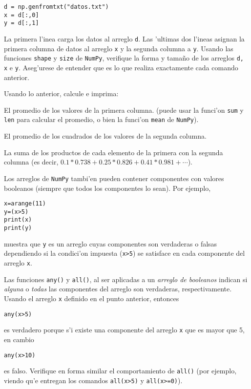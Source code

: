 \documentclass[11pt]{exam}
\begin{document}
\begin{questions}
\begin{verbatim}
d = np.genfromtxt("datos.txt")
x = d[:,0]
y = d[:,1]
\end{verbatim}

La primera l'inea carga los datos al arreglo \texttt{d}. Las 'ultimas dos l'ineas asignan la primera columna de datos al arreglo \texttt{x} y la segunda columna a \texttt{y}. Usando las funciones \texttt{shape} y \texttt{size} de \texttt{NumPy}, verifique la forma y tama\~no de los arreglos \texttt{d, x} e \texttt{y}. Aseg'urese de entender que es lo que realiza exactamente cada comando anterior.

\item Usando lo anterior, calcule e imprima:
\begin{parts}
\item El promedio de los valores de la primera columna. (puede usar la funci'on \texttt{sum} y \texttt{len} para calcular el promedio, o bien la funci'on \texttt{mean} de \texttt{NumPy}).
\item El promedio de los cuadrados de los valores de la segunda columna.
\item La suma de los productos de cada elemento de la primera con la segunda columna (es decir, $0.1*0.738 + 0.25 *	0.826 + 0.41 * 0.981 +\cdots$).
\end{parts}

\item Los arreglos de \texttt{NumPy} tambi'en pueden contener componentes con valores booleanos (siempre que todos los componentes lo sean). Por ejemplo,

\begin{verbatim}
x=arange(11)
y=(x>5)
print(x)
print(y)
\end{verbatim}

muestra que \texttt{y} es un arreglo cuyas componentes son verdaderas o falsas dependiendo si la condici'on impuesta (\texttt{x>5}) se satisface en cada componente del arreglo \texttt{x}.


\item Las funciones \texttt{any()} y \texttt{all()}, al ser aplicadas a un \textit{arreglo de booleanos} indican si \textit{alguna} o \textit{todas} las componentes del arreglo son verdaderas, respectivamente. Usando el arreglo \texttt{x} definido en el punto anterior, entonces

\begin{verbatim}
any(x>5)
\end{verbatim}

es verdadero porque s'i existe una componente del arreglo \texttt{x} que es mayor que 5, en cambio 
\begin{verbatim}
any(x>10)
\end{verbatim}
es falso. Verifique en forma similar el comportamiento de \texttt{all()} (por ejemplo, viendo qu'e entregan los comandos \texttt{all(x>5)} y \texttt{all(x>=0)}).
\end{questions}
\end{document}
